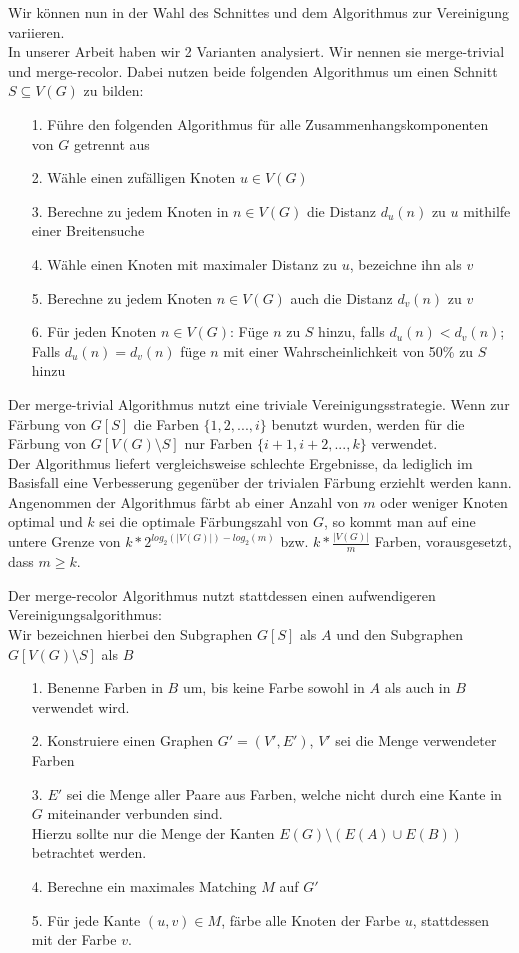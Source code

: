 \documentclass[11pt]{article}
\begin{document}
Wir können nun in der Wahl des Schnittes und dem Algorithmus zur Vereinigung variieren.\\
In unserer Arbeit haben wir 2 Varianten analysiert. Wir nennen sie merge-trivial und merge-recolor.
Dabei nutzen beide folgenden Algorithmus um einen Schnitt $S\subseteq V(G)$ zu bilden:
\begin{itemize}
\item[1.] Führe den folgenden Algorithmus für alle Zusammenhangskomponenten von $G$ getrennt aus
\item[2.] Wähle einen zufälligen Knoten $u\in V(G)$
\item[3.] Berechne zu jedem Knoten in $n\in V(G)$ die Distanz $d_u(n)$ zu $u$ mithilfe einer Breitensuche
\item[4.] Wähle einen Knoten mit maximaler Distanz zu $u$, bezeichne ihn als $v$
\item[5.] Berechne zu jedem Knoten $n\in V(G)$ auch die Distanz $d_v(n)$ zu $v$
\item[6.] Für jeden Knoten $n\in V(G)$: Füge $n$ zu $S$ hinzu, falls $d_u(n)<d_v(n)$; Falls $d_u(n)=d_v(n)$ füge $n$ mit einer Wahrscheinlichkeit von 50\% zu $S$ hinzu
\end{itemize}

Der merge-trivial Algorithmus nutzt eine triviale Vereinigungsstrategie. 
Wenn zur Färbung von $G[S]$ die Farben $\{1,2,...,i\}$ benutzt wurden, 
werden für die Färbung von $G[V(G)\setminus S]$ nur Farben $\{i+1,i+2,...,k\}$ verwendet.\\

Der Algorithmus liefert vergleichsweise schlechte Ergebnisse, 
da lediglich im Basisfall eine Verbesserung gegenüber der trivialen Färbung erziehlt werden kann.
Angenommen der Algorithmus färbt ab einer Anzahl von $m$ oder weniger Knoten optimal
und $k$ sei die optimale Färbungszahl von $G$, so kommt man auf eine untere Grenze von 
$k*2^{log_2(|V(G)|)-log_2(m)}$ bzw. $k*\frac{|V(G)|}{m}$ Farben, vorausgesetzt, dass $m\geq k$.\par

Der merge-recolor Algorithmus nutzt stattdessen einen aufwendigeren Vereinigungsalgorithmus:\\
Wir bezeichnen hierbei den Subgraphen $G[S]$ als $A$ und den Subgraphen $G[V(G)\setminus S]$ als $B$
\begin{itemize}
\item[1.] Benenne Farben in $B$ um, bis keine Farbe sowohl in $A$ als auch in $B$ verwendet wird.
\item[2.] Konstruiere einen Graphen $G'=(V',E')$, $V'$ sei die Menge verwendeter Farben
\item[3.] $E'$ sei die Menge aller Paare aus Farben, welche nicht durch eine Kante in $G$ miteinander verbunden sind. \\Hierzu sollte nur die Menge der Kanten $E(G)\setminus (E(A)\cup E(B))$ betrachtet werden.
\item[4.] Berechne ein maximales Matching $M$ auf $G'$
\item[5.] Für jede Kante $(u,v)\in M$, färbe alle Knoten der Farbe $u$, stattdessen mit der Farbe $v$.
\end{itemize}
\end{document}

